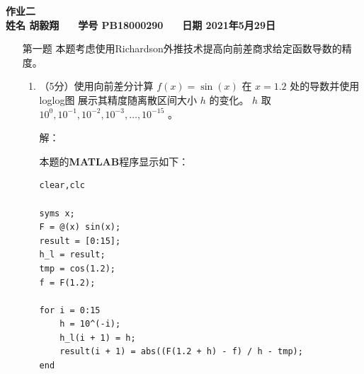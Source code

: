 \documentclass[12pt,a4paper,UTF8]{ctexart}
\theoremstyle{nonumberplain}
\begin{document}


\begin{center}
    \textbf{作业二}\\
    \textbf{姓名 胡毅翔 ~~ 学号 PB18000290 ~~ 日期 2021年5月29日}\\
\end{center}

\begin{center}
    \fbox{
        \begin{minipage}{40em}
            \vspace{5cm}
            \hspace{20cm}
        \end{minipage}}
\end{center}
\vspace{1cm}

\begin{enumerate}
    \item[第一题] 本题考虑使用Richardson外推技术提高向前差商求给定函数导数的精度。
          \begin{enumerate}\item  （5分）使用向前差分计算 $f(x)=\sin (x)$ 在 $x=1.2$ 处的导数并使用loglog图 展示其精度随离散区间大小 $h$ 的变化。 $h$ 取 $10^{0}, 10^{-1}, 10^{-2}, 10^{-3}, \ldots, 10^{-15}$ 。
                    \par 解：
                    \par 本题的\textbf{MATLAB}程序显示如下：
                    \begin{lstlisting}[frame=single]
clear,clc

syms x;
F = @(x) sin(x);
result = [0:15];
h_l = result;
tmp = cos(1.2);
f = F(1.2);

for i = 0:15
    h = 10^(-i);
    h_l(i + 1) = h;
    result(i + 1) = abs((F(1.2 + h) - f) / h - tmp);
end


\end{lstlisting}
\end{enumerate}
\end{enumerate}
\end{document}
